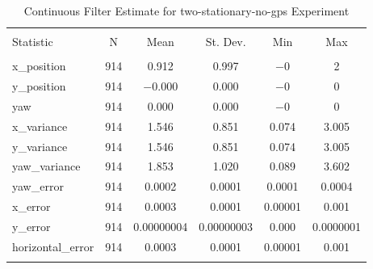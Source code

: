 
\begin{table}[h] \centering 
  \caption{Continuous Filter Estimate for two-stationary-no-gps Experiment} 
  \label{tab:two_stationary_no_gps_continuous_summary} 
\begin{tabular}{@{\extracolsep{5pt}}lccccc} 
\\[-1.8ex]\hline 
\hline \\[-1.8ex] 
Statistic & \multicolumn{1}{c}{N} & \multicolumn{1}{c}{Mean} & \multicolumn{1}{c}{St. Dev.} & \multicolumn{1}{c}{Min} & \multicolumn{1}{c}{Max} \\ 
\hline \\[-1.8ex] 
x\_position & 914 & 0.912 & 0.997 & $-$0 & 2 \\ 
y\_position & 914 & $-$0.000 & 0.000 & $-$0 & 0 \\ 
yaw & 914 & 0.000 & 0.000 & $-$0 & 0 \\ 
x\_variance & 914 & 1.546 & 0.851 & 0.074 & 3.005 \\ 
y\_variance & 914 & 1.546 & 0.851 & 0.074 & 3.005 \\ 
yaw\_variance & 914 & 1.853 & 1.020 & 0.089 & 3.602 \\ 
yaw\_error & 914 & 0.0002 & 0.0001 & 0.0001 & 0.0004 \\ 
x\_error & 914 & 0.0003 & 0.0001 & 0.00001 & 0.001 \\ 
y\_error & 914 & 0.00000004 & 0.00000003 & 0.000 & 0.0000001 \\ 
horizontal\_error & 914 & 0.0003 & 0.0001 & 0.00001 & 0.001 \\ 
\hline \\[-1.8ex] 
\end{tabular} 
\end{table} 

